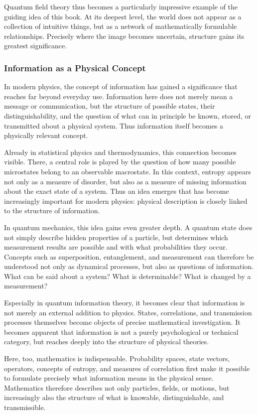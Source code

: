 Quantum field theory thus becomes
a particularly impressive example
of the guiding idea of this book.
At its deepest level, the world does not appear
as a collection of intuitive things,
but as a network of mathematically formulable relationships.
Precisely where the image becomes uncertain,
structure gains its greatest significance.

\subsubsection{Information as a Physical Concept}

In modern physics, the concept of information has gained a significance
that reaches far beyond everyday use.
Information here does not merely mean a message or communication,
but the structure of possible states,
their distinguishability,
and the question
of what can in principle be known,
stored,
or transmitted about a physical system.
Thus information itself becomes a physically relevant concept.

Already in statistical physics and thermodynamics,
this connection becomes visible.
There, a central role is played by the question
of how many possible microstates belong to an observable macrostate.
In this context, entropy appears not only as a measure of disorder,
but also as a measure of missing information
about the exact state of a system.
Thus an idea emerges
that has become increasingly important for modern physics:
physical description is closely linked
to the structure of information.

In quantum mechanics, this idea gains even greater depth.
A quantum state does not simply describe hidden properties of a particle,
but determines
which measurement results are possible
and with what probabilities they occur.
Concepts such as superposition,
entanglement,
and measurement
can therefore be understood not only as dynamical processes,
but also as questions of information.
What can be said about a system?
What is determinable?
What is changed by a measurement?

Especially in quantum information theory,
it becomes clear
that information is not merely an external addition to physics.
States,
correlations,
and transmission processes
themselves become objects of precise mathematical investigation.
It becomes apparent
that information is not a purely psychological or technical category,
but reaches deeply into the structure of physical theories.

Here, too, mathematics is indispensable.
Probability spaces,
state vectors,
operators,
concepts of entropy,
and measures of correlation
first make it possible
to formulate precisely what information means in the physical sense.
Mathematics therefore describes not only particles,
fields,
or motions,
but increasingly also the structure of what is knowable,
distinguishable,
and transmissible.

